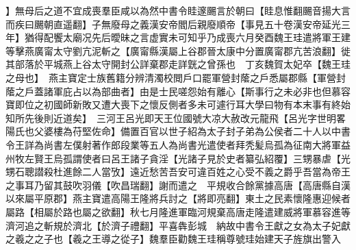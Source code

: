 】無母后之道不宜成喪羣臣咸以為然中書令眭邃颺言於朝曰【眭息惟翻颺音揚大言而疾曰颺朝直遥翻】子無廢母之義漢安帝閻后親廢順帝【事見五十卷漢安帝延光三年】猶得配饗太廟况先后曖昧之言虚實未可知乎乃成喪六月癸酉魏王珪遣將軍王建等擊燕廣甯太守劉亢泥斬之【廣甯縣漢屬上谷郡晉太康中分置廣甯郡亢苦浪翻】徙其部落於平城燕上谷太守開封公詳棄郡走詳皝之曾孫也　丁亥魏賀太妃卒【魏王珪之母也】　燕主寶定士族舊籍分辨清濁校閲戶口罷軍營封䕃之戶悉屬郡縣【軍營封䕃之戶蓋諸軍庇占以為部曲者】由是士民嗟怨始有離心【斯事行之未必非也但慕容寶即位之初國師新敗又遭大喪下之懷反側者多未可遽行耳大學曰物有本末事有終始知所先後則近道矣】　三河王呂光即天王位國號大凉大赦改元龍飛【呂光字世明畧陽氏也父婆樓為苻堅佐命】備置百官以世子紹為太子封子弟為公侯者二十人以中書令王詳為尚書左僕射著作郎段業等五人為尚書光遣使者拜秃髪烏孤為征南大將軍益州牧左賢王烏孤謂使者曰呂王諸子貪淫【光諸子見於史者纂弘紹覆】三甥暴虐【光甥石聰譛殺杜進餘二人當攷】遠近愁苦吾安可違百姓之心受不義之爵乎吾當為帝王之事耳乃留其鼓吹羽儀【吹昌瑞翻】謝而遣之　平規收合餘黨據高唐【高唐縣自漢以來屬平原郡】燕主寶遣高陽王隆將兵討之【將即亮翻】東土之民素懷隆惠迎候者屬路【相屬於路也屬之欲翻】秋七月隆進軍臨河規棄高唐走隆遣建威將軍慕容進等濟河追之斬規於濟北【於濟子禮翻】平喜犇彭城　納故中書令王獻之女為太子妃獻之羲之之子也【羲之王導之從子】魏羣臣勸魏王珪稱尊號珪始建天子旌旗出警入

